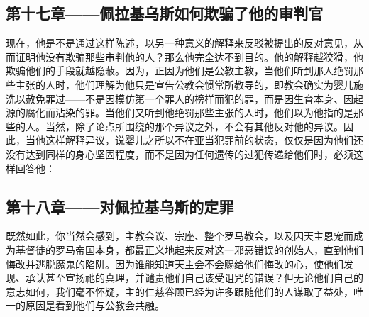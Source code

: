 \subsection{第十七章——佩拉基乌斯如何欺骗了他的审判官}

现在，他是不是通过这样陈述，以另一种意义的解释来反驳被提出的反对意见，从而证明他没有欺骗那些审判他的人？那么他完全达不到目的。他的解释越狡猾，他欺骗他们的手段就越隐蔽。因为，正因为他们是公教主教，当他们听到那人绝罚那些主张的人时，他们理解为他只是宣告公教会惯常所教导的，即教会确实为婴儿施洗以赦免罪过——不是因模仿第一个罪人的榜样而犯的罪，而是因生育本身、因起源的腐化而沾染的罪。当他们又听到他绝罚那些主张的人时，他们以为他指的是那些的人。当然，除了论点所围绕的那个异议之外，不会有其他反对他的异议。因此，当他这样解释异议，说婴儿之所以不在亚当犯罪前的状态，仅仅是因为他们还没有达到同样的身心坚固程度，而不是因为任何遗传的过犯传递给他们时，必须这样回答他：\par


\subsection{第十八章——对佩拉基乌斯的定罪}

既然如此，你当然会感到，主教会议、宗座、整个罗马教会，以及因天主恩宠而成为基督徒的罗马帝国本身，都最正义地起来反对这一邪恶错误的创始人，直到他们悔改并逃脱魔鬼的陷阱。因为谁能知道天主会不会赐给他们悔改的心，使他们发现、承认甚至宣扬祂的真理，并谴责他们自己该受诅咒的错误？但无论他们自己的意志如何，我们毫不怀疑，主的仁慈眷顾已经为许多跟随他们的人谋取了益处，唯一的原因是看到他们与公教会共融。\par


